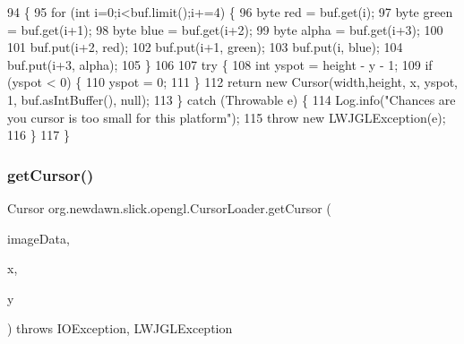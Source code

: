 \begin{DoxyCode}
94                                                                                                            
           \{
95         \textcolor{keywordflow}{for} (\textcolor{keywordtype}{int} i=0;i<buf.limit();i+=4) \{
96             byte red = buf.get(i);
97             byte green = buf.get(i+1);
98             byte blue = buf.get(i+2);
99             byte alpha = buf.get(i+3);
100             
101             buf.put(i+2, red);
102             buf.put(i+1, green);
103             buf.put(i, blue);
104             buf.put(i+3, alpha);
105         \}
106         
107         \textcolor{keywordflow}{try} \{
108             \textcolor{keywordtype}{int} yspot = height - y - 1;
109             \textcolor{keywordflow}{if} (yspot < 0) \{
110                 yspot = 0;
111             \}
112             \textcolor{keywordflow}{return} \textcolor{keyword}{new} Cursor(width,height, x, yspot, 1, buf.asIntBuffer(), null);
113         \} \textcolor{keywordflow}{catch} (Throwable e) \{
114             Log.info(\textcolor{stringliteral}{"Chances are you cursor is too small for this platform"});
115             \textcolor{keywordflow}{throw} \textcolor{keyword}{new} LWJGLException(e);
116         \}
117     \}
\end{DoxyCode}
\mbox{\label{classorg_1_1newdawn_1_1slick_1_1opengl_1_1_cursor_loader_af11a55cc66ccb52ecb4f9ded039852d6}} 
\subsubsection{\texorpdfstring{get\+Cursor()}{getCursor()}\hspace{0.1cm}{\footnotesize\ttfamily [3/3]}}
{\footnotesize\ttfamily Cursor org.\+newdawn.\+slick.\+opengl.\+Cursor\+Loader.\+get\+Cursor (\begin{DoxyParamCaption}\item[{\mbox{\hyperlink{interfaceorg_1_1newdawn_1_1slick_1_1opengl_1_1_image_data}{Image\+Data}}}]{image\+Data,  }\item[{int}]{x,  }\item[{int}]{y }\end{DoxyParamCaption}) throws I\+O\+Exception, L\+W\+J\+G\+L\+Exception\hspace{0.3cm}{\ttfamily [inline]}}

